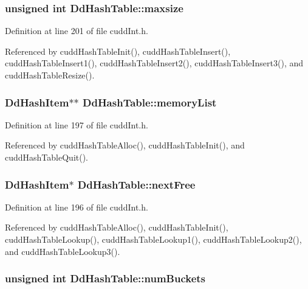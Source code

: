 \subsubsection{\setlength{\rightskip}{0pt plus 5cm}unsigned int \bf{Dd\-Hash\-Table::maxsize}}\label{structDdHashTable_ba376a6d310dcead9f74cfc459f4a248}




Definition at line 201 of file cudd\-Int.h.

Referenced by cudd\-Hash\-Table\-Init(), cudd\-Hash\-Table\-Insert(), cudd\-Hash\-Table\-Insert1(), cudd\-Hash\-Table\-Insert2(), cudd\-Hash\-Table\-Insert3(), and cudd\-Hash\-Table\-Resize().
\subsubsection{\setlength{\rightskip}{0pt plus 5cm}\bf{Dd\-Hash\-Item}$\ast$$\ast$ \bf{Dd\-Hash\-Table::memory\-List}}\label{structDdHashTable_c6afee68587d525006440d95abc9cbd5}




Definition at line 197 of file cudd\-Int.h.

Referenced by cudd\-Hash\-Table\-Alloc(), cudd\-Hash\-Table\-Init(), and cudd\-Hash\-Table\-Quit().
\subsubsection{\setlength{\rightskip}{0pt plus 5cm}\bf{Dd\-Hash\-Item}$\ast$ \bf{Dd\-Hash\-Table::next\-Free}}\label{structDdHashTable_2c4a170b93727184b147b4aa8945471c}




Definition at line 196 of file cudd\-Int.h.

Referenced by cudd\-Hash\-Table\-Alloc(), cudd\-Hash\-Table\-Init(), cudd\-Hash\-Table\-Lookup(), cudd\-Hash\-Table\-Lookup1(), cudd\-Hash\-Table\-Lookup2(), and cudd\-Hash\-Table\-Lookup3().
\subsubsection{\setlength{\rightskip}{0pt plus 5cm}unsigned int \bf{Dd\-Hash\-Table::num\-Buckets}}\label{structDdHashTable_99ecb46b5e08f1344e8f122f1ae11d9b}




